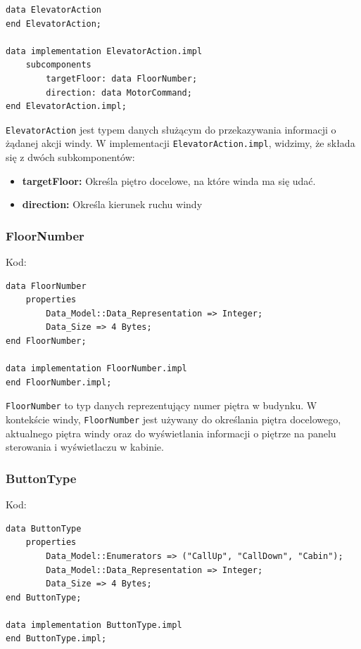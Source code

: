 \documentclass{article}
\begin{document}
    \begin{lstlisting}[basicstyle=\ttfamily, keywordstyle=\bfseries]
data ElevatorAction
end ElevatorAction;

data implementation ElevatorAction.impl
    subcomponents
        targetFloor: data FloorNumber;
        direction: data MotorCommand;
end ElevatorAction.impl;
    \end{lstlisting}

    \texttt{ElevatorAction} jest typem danych służącym do przekazywania informacji o żądanej akcji windy. W implementacji \texttt{ElevatorAction.impl}, widzimy, że składa się z dwóch subkomponentów:

    \begin{itemize}
        \item \textbf{targetFloor:} Określa piętro docelowe, na które winda ma się udać.
        \item \textbf{direction:} Określa kierunek ruchu windy
    \end{itemize}


    \subsubsection{FloorNumber}

    Kod:
    
        \begin{lstlisting}[basicstyle=\ttfamily, keywordstyle=\bfseries]
data FloorNumber
    properties
        Data_Model::Data_Representation => Integer;
        Data_Size => 4 Bytes;
end FloorNumber;

data implementation FloorNumber.impl
end FloorNumber.impl;
        \end{lstlisting}
    
        \texttt{FloorNumber} to typ danych reprezentujący numer piętra w budynku. W kontekście windy, \texttt{FloorNumber} jest używany do określania piętra docelowego, aktualnego piętra windy oraz do wyświetlania informacji o piętrze na panelu sterowania i wyświetlaczu w kabinie.
    

    \subsubsection{ButtonType}

    Kod:
    
    \begin{lstlisting}[basicstyle=\ttfamily, keywordstyle=\bfseries]
data ButtonType
    properties
        Data_Model::Enumerators => ("CallUp", "CallDown", "Cabin");
        Data_Model::Data_Representation => Integer;
        Data_Size => 4 Bytes;
end ButtonType;

data implementation ButtonType.impl
end ButtonType.impl;
    \end{lstlisting}
\end{document}
